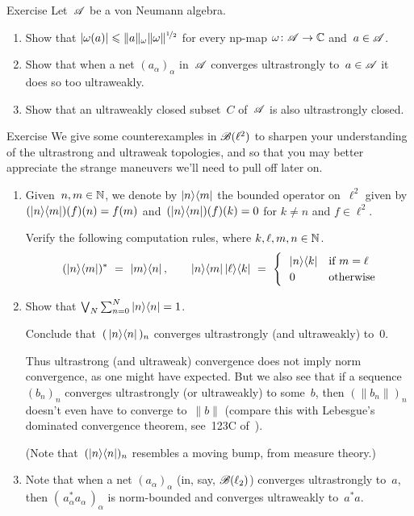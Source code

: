 \documentclass[a]{subfiles}
\begin{document}
\begin{parsec}%
\begin{point}{Exercise}%
Let~$\scrA$ be a von Neumann algebra.
\begin{enumerate}
\item
Show that 
$\left|\omega(a)\right|\leq \|a\|_\omega \|\omega\|^{\nicefrac{1}{2}}$
for every np-map $\omega\colon \scrA\to\C$
and~$a\in\scrA$.
\item
Show that when a net $(a_\alpha)_\alpha$
in~$\scrA$ converges ultrastrongly to~$a\in \scrA$
it does so too ultraweakly.
\item
Show that an ultraweakly closed subset~$C$ of~$\scrA$
is also ultrastrongly closed.
\end{enumerate}
\end{point}
\begin{point}[vn-counterexamples]{Exercise}%
We give some counterexamples in $\scrB(\ell^2)$
to sharpen your understanding of the ultrastrong and ultraweak topologies,
and so that you may better appreciate
the strange maneuvers we'll need to pull off later on.
\begin{enumerate}
\item
Given~$n,m\in \N$,
we denote by $\ketbra{n}{m}$
the bounded operator on~$\ell^2$
given by $(\ketbra{n}{m})(f)(n)=f(m)$
and~$(\ketbra{n}{m})(f)(k)=0$ for $k\neq n$
and $f\in \ell^2$.

Verify the following computation rules,
where $k,\ell,m,n\in \N$.
\begin{equation*}
(\ketbra{n}{m})^*\ =\ \ketbra{m}{n},
\qquad
\ketbra{n}{m}\ketbra{\ell}{k}\ =\ 
\begin{cases}
\ \ \ketbra{n}{k} & \text{if $m=\ell$} \\
\ \ 0 & \text{otherwise}
\end{cases}
\end{equation*}
\item
Show that $\bigvee_N \sum_{n=0}^N \ketbra{n}{n}=1$.

Conclude that~$(\,\ketbra{n}{n}\,)_n$
converges ultrastrongly (and ultraweakly) to~$0$.

Thus ultrastrong (and ultraweak) convergence does not imply norm convergence,
as one might have expected.
But we also see that if a sequence~$(b_n)_n$ converges ultrastrongly
(or ultraweakly) to some~$b$,
then $(\|b_n\|)_n$ doesn't even have to converge to~$\|b\|$
(compare this with Lebesgue's dominated convergence
theorem, see~123C of~\cite{fremlin}).

(Note that~$(\ketbra{n}{n})_n$ resembles a moving bump, from measure theory.)
\item
Note that when a net $(a_\alpha)_\alpha$
(in, say, $\scrB(\ell_2)$)
converges ultrastrongly to~$a$,
then $(\,a_\alpha^*a_\alpha\,)_\alpha$
is norm-bounded and
converges ultraweakly to~$a^*a$.


\end{enumerate}
\end{point}
\end{parsec}
\end{document}
